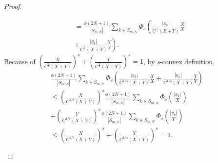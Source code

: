 \documentclass[12pt,a4paper]{article}
\theoremstyle{remark}
\begin{document}
\begin{proof}
\begin{enumerate}
\begin{eqnarray*}
            &=  \frac{\phi\left(2N+1\right)}{\left|S_{m,N}\right|}\sum_{k\in S_{m,N}}\Phi_s\left(\frac{\left|x_k\right|}{C^{\frac{1}{s}} \left(X+Y\right)}\frac{X}{X} \right.\\
            & \left.+\frac{\left|y_k\right|}{C^{\frac{1}{s}} \left(X+Y\right)}\frac{Y}{Y}\right). 
        \end{eqnarray*}
        Because of $\left(\frac{X}{C^{\frac{1}{s}} \left(X+Y\right)}\right)^s+\left(\frac{Y}{C^{\frac{1}{s}} \left(X+Y\right)}\right)^s=1$, by \emph{s}-convex definition,
        \begin{multline*}
            \frac{\phi(2N+1)}{|S_{m,N}|} \sum_{k\in S_{m,N}} 
            \Phi_s\!\left(
               \frac{|x_k|}{C^{1/s}(X+Y)}\frac{X}{X}
               + \frac{|y_k|}{C^{1/s}(X+Y)}\frac{Y}{Y}
            \right)
            \\
            \leq
            \left(\frac{X}{C^{1/s}(X+Y)}\right)^s 
               \frac{\phi(2N+1)}{|S_{m,N}|}\sum_{k\in S_{m,N}} \Phi_s\!\left(\frac{|x_k|}{X}\right)
            \\
            + \left(\frac{Y}{C^{1/s}(X+Y)}\right)^s 
               \frac{\phi(2N+1)}{|S_{m,N}|}\sum_{k\in S_{m,N}} \Phi_s\!\left(\frac{|y_k|}{Y}\right)
            \\
            \leq
            \left(\frac{X}{C^{1/s}(X+Y)}\right)^s
            + \left(\frac{Y}{C^{1/s}(X+Y)}\right)^s
            = 1.
        \end{multline*}



\end{enumerate}
\end{proof}
\end{document}
